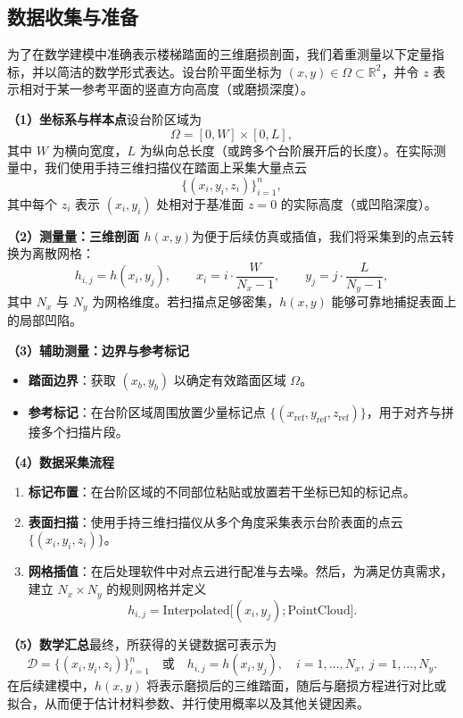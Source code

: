\documentclass[11pt,a4paper,fontset=windows]{ctexart}
\newcommand{\R}{\mathbb{R}}
\begin{document}
\subsection{数据收集与准备}

为了在数学建模中准确表示楼梯踏面的三维磨损剖面，我们着重测量以下定量指标，并以简洁的数学形式表达。设台阶平面坐标为 $(x,y)\in\Omega\subset\R^2$，并令 $z$ 表示相对于某一参考平面的竖直方向高度（或磨损深度）。

\noindent\textbf{（1）坐标系与样本点}\quad 设台阶区域为
\[
\Omega=[0,W]\times[0,L],
\]
其中 $W$ 为横向宽度，$L$ 为纵向总长度（或跨多个台阶展开后的长度）。在实际测量中，我们使用手持三维扫描仪在踏面上采集大量点云
\[
\bigl\{(x_i,y_i,z_i)\bigr\}_{i=1}^{n},
\]
其中每个 $z_i$ 表示 $(x_i,y_i)$ 处相对于基准面 $z=0$ 的实际高度（或凹陷深度）。

\noindent\textbf{（2）测量量：三维剖面 $h(x,y)$}\quad 为便于后续仿真或插值，我们将采集到的点云转换为离散网格：
\[
h_{i,j}=h(x_i,y_j),\qquad x_i=i\cdot\frac{W}{N_x-1},\qquad y_j=j\cdot\frac{L}{N_y-1},
\]
其中 $N_x$ 与 $N_y$ 为网格维度。若扫描点足够密集，$h(x,y)$ 能够可靠地捕捉表面上的局部凹陷。

\noindent\textbf{（3）辅助测量：边界与参考标记}
\begin{itemize}
\item \textbf{踏面边界}：获取 $(x_b,y_b)$ 以确定有效踏面区域 $\Omega$。
\item \textbf{参考标记}：在台阶区域周围放置少量标记点 $\{(x_{\text{ref}},y_{\text{ref}},z_{\text{ref}})\}$，用于对齐与拼接多个扫描片段。
\end{itemize}

\noindent\textbf{（4）数据采集流程}
\begin{enumerate}
\item \textbf{标记布置}：在台阶区域的不同部位粘贴或放置若干坐标已知的标记点。
\item \textbf{表面扫描}：使用手持三维扫描仪从多个角度采集表示台阶表面的点云 $\{(x_i,y_i,z_i)\}$。
\item \textbf{网格插值}：在后处理软件中对点云进行配准与去噪。然后，为满足仿真需求，建立 $N_x\times N_y$ 的规则网格并定义
\[
h_{i,j}=\text{Interpolated}\bigl[(x_i,y_j);\text{PointCloud}\bigr].
\]
\end{enumerate}

\noindent\textbf{（5）数学汇总}\quad 最终，所获得的关键数据可表示为
\[
\mathcal{D}=\bigl\{(x_i,y_i,z_i)\bigr\}_{i=1}^{n}
\quad\text{或}\quad
h_{i,j}=h(x_i,y_j),\quad i=1,\dots,N_x,\ j=1,\dots,N_y.
\]
在后续建模中，$h(x,y)$ 将表示磨损后的三维踏面，随后与磨损方程进行对比或拟合，从而便于估计材料参数、并行使用概率以及其他关键因素。
\end{document}
